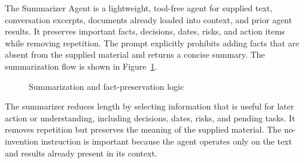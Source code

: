 The Summarizer Agent is a lightweight, tool-free agent for supplied text,
conversation excerpts, documents already loaded into context, and prior agent
results. It preserves important facts, decisions, dates, risks, and action
items while removing repetition. The prompt explicitly prohibits adding facts
that are absent from the supplied material and returns a concise summary.
The summarization flow is shown in Figure~\ref{fig:summarizer-logic}.
\begin{figure}[H]\centering
{}
\caption{Summarization and fact-preservation logic}
\label{fig:summarizer-logic}
\end{figure}
The summarizer reduces length by selecting information that is useful for later action or understanding, including decisions, dates, risks, and pending tasks. It removes repetition but preserves the meaning of the supplied material. The no-invention instruction is important because the agent operates only on the text and results already present in its context.

\clearpage
{}


